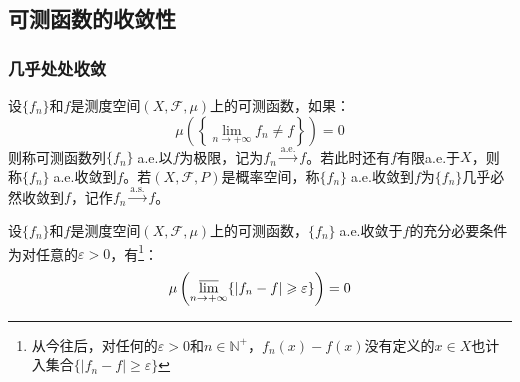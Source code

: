 \subsection{可测函数的收敛性}
\subsubsection{几乎处处收敛}
\begin{definition}
	设$\{f_n\}$和$f$是测度空间$(X,\mathscr{F},\mu)$上的可测函数，如果：
	\begin{equation*}
		\mu\left(\left\{\lim_{n\to+\infty}f_n\ne f\right\}\right)=0
	\end{equation*}
	则称可测函数列$\{f_n\}\;$a.e.以$f$为极限，记为$f_n\overset{\text{a.e.}}{\longrightarrow}f$。若此时还有$f$有限a.e.于$X$，则称$\{f_n\}\;$a.e.收敛到$f$。若$(X,\mathscr{F},P)$是概率空间，称$\{f_n\}\;$a.e.收敛到$f$为$\{f_n\}$几乎必然收敛到$f$，记作$f_n\overset{\text{a.s.}}{\longrightarrow}f$。
\end{definition}
\begin{theorem}\label{theo:EquiConditiona.e.}
	设$\{f_n\}$和$f$是测度空间$(X,\mathscr{F},\mu)$上的可测函数，$\{f_n\}\;$a.e.收敛于$f$的充分必要条件为对任意的$\varepsilon>0$，有\footnote{从今往后，对任何的$\varepsilon>0$和$n\in\mathbb{N}^+$，$f_n(x)-f(x)$没有定义的$x\in X$也计入集合$\{|f_n-f|\geqslant\varepsilon\}$}：
	\begin{equation*}
		\mu\left(\varlimsup_{n\to+\infty}\{|f_n-f|\geqslant\varepsilon\}\right)=0
	\end{equation*}
\end{theorem}
